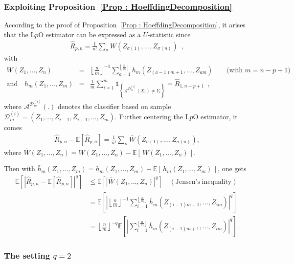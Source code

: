 \documentclass[twoside,11pt]{article}
\numberwithin{equation}{section}
\newcommand{\esp}[1]{\mathbb{E}\left[#1 \right]}
\newcommand{\gp}[1]{\left(#1\right)}
\newcommand{\ga}[1]{\left\{#1\right\}}
\newcommand{\floor}[1]{\left\lfloor #1 \right\rfloor}
\newcommand{\1}{\mathds{1}}%
\newcommand{\paren}[1]{\left( #1 \right)}
\newcommand{\croch}[1]{\left[\, #1 \,\right]}
\newcommand{\abs}[1]{\left\lvert #1 \right\rvert} %
\newcommand{\E}{\mathbb{E}}
\newcommand{\Rh}{\widehat{R}}
\newcommand{\D}{\mathcal{D}}
\newcommand{\A}{\mathcal{A}}
\numberwithin{equation}{section}
\theoremstyle{plain}
\begin{document}
\subsubsection{Exploiting Proposition~\ref{Prop : HoeffdingDecomposition}}
%
According to the proof of Proposition~\ref{Prop : HoeffdingDecomposition}, it arises that the L$p$O estimator can be expressed as a $U$-statistic since
%
\begin{eqnarray*}
\Rh_{p,n} = \frac{1}{n!} \sum_{\sigma} W\gp{Z_{\sigma(1)},\ldots,Z_{\sigma(n)}} \enspace,
\end{eqnarray*}
with
\begin{eqnarray*}
W\paren{Z_1,\ldots,Z_n} &=& \floor{ \frac{n}{m}}^{-1} \sum_{a = 1} ^{\floor{ \frac{n}{m}}} h_m\paren{ Z_{(a-1)m+1},\ldots,Z_{am}}\qquad \mbox{(with $m=n-p+1$)} \\
\text{and }\ \ \  h_m\paren{ Z_{1},\ldots,Z_{m}} &=& \frac{1}{m} \sum_{i=1}^m \1_{\ga{ \A^{\D_m^{(i)}}( X_i) \neq Y_i }} = \Rh_{1,n-p+1} \enspace,
\end{eqnarray*}
where $\A^{\D_m^{(i)}}( .)$ denotes the classifier based on sample $\D_m^{(i)}=(Z_{1},\ldots,Z_{i-1},Z_{i+1},\ldots,Z_{m})$.
%
Further centering the L$p$O estimator, it comes
\begin{eqnarray*}
\Rh_{p,n} -\esp{ \Rh_{p,n} } = \frac{1}{n!} \sum_{\sigma} \bar W\gp{Z_{\sigma(1)},\ldots,Z_{\sigma(n)}},
\end{eqnarray*}
where $\bar W(Z_1,\ldots,Z_n) = W(Z_1,\ldots,Z_n) - \E\croch{W(Z_1,\ldots,Z_n)}$.

Then with $\bar h_m(Z_1,\ldots,Z_m) = h_m(Z_1,\ldots,Z_m) - \E\croch{ h_m(Z_1,\ldots,Z_m) }$, one gets
\begin{align}
\esp{ \abs{ \Rh_{p,n} - \esp{\Rh_{p,n}} }^{q}  }
%
 & \leq  \esp{ \abs{  \bar W\paren{Z_1,\ldots,Z_n} }^{q}  } \quad \mathrm{(Jensen's\ inequality)} \nonumber \\
%
 & =  \esp{  \abs{ \floor{ \frac{n}{m}}^{-1}  \sum_{i = 1} ^{\floor{ \frac{n}{m}}}  \bar h_m\paren{ Z_{(i-1)m+1},\ldots,Z_{im}} }^{q}  }  \label{ineq.Lpo.Ustat.Jensen} \\
%
 & =  \floor{ \frac{n}{m}}^{-q} \esp{ \abs{ \sum_{i = 1} ^{\floor{ \frac{n}{m}}}  \bar h_m\paren{ Z_{(i-1)m+1},\ldots,Z_{im}} }^{q}  } \nonumber .
\end{align}






\subsubsection{The setting $q=2$}
\end{document}

